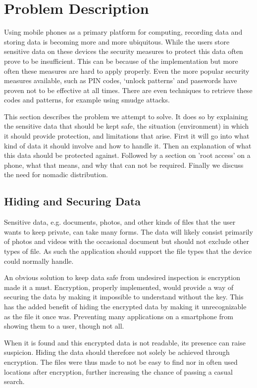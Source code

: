 \section{Problem Description}
\label{sec:problem-description}
Using mobile phones as a primary platform for computing, recording data and storing data is becoming more and more ubiquitous.
While the users store sensitive data on these devices the security measures to protect this data often prove to be insufficient.
This can be because of the implementation but more often these measures are hard to apply properly.
Even the more popular security measures available, such as PIN codes, `unlock patterns' and passwords have proven not to be effective at all times.
There are even techniques to retrieve these codes and patterns, for example using smudge attacks\cite{aviv2010smudge}.

This section describes the problem we attempt to solve.
It does so by explaining the sensitive data that should be kept safe, the situation (environment) in which it should provide protection, and limitations that arise. 
First it will go into what kind of data it should involve and how to handle it. 
Then an explanation of what this data should be protected against. 
Followed by a section on 'root access' on a phone, what that means, and why that can not be required.
Finally we discuss the need for nomadic distribution.

\subsection{Hiding and Securing Data}
Sensitive data, e.g. documents, photos, and other kinds of files that the user wants to keep private, can take many forms.
The data will likely consist primarily of photos and videos with the occasional document but should not exclude other types of file.
As such the application should support the file types that the device could normally handle.

An obvious solution to keep data safe from undesired inspection is encryption made it a must.
Encryption, properly implemented, would provide a way of securing the data by making it impossible to understand without the key. 
This has the added benefit of hiding the encrypted data by making it unrecognizable as the file it once was.
Preventing many applications on a smartphone from showing them to a user, though not all.

When it is found and this encrypted data is not readable, its presence can raise suspicion.
Hiding the data should therefore not solely be achieved through encryption.
The files were thus made to not be easy to find nor in often used locations after encryption, further increasing the chance of passing a casual search.

